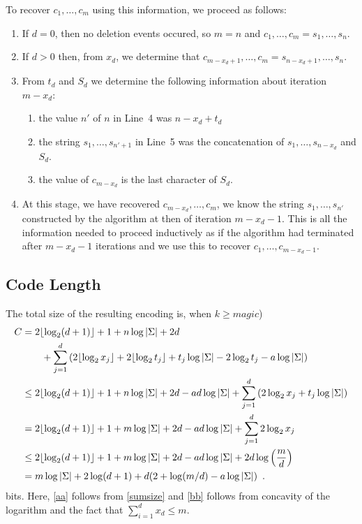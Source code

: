 \documentclass{patmorin}
\newcommand{\floor}[1]{\lfloor #1\rfloor}
\begin{document}
To recover $c_1,\ldots,c_m$ using this information, we proceed as follows:
\begin{enumerate}
  \item If $d=0$, then no deletion events occured, so $m=n$ and $c_1,\ldots,c_m = s_1,\ldots,s_n$.
  \item If $d>0$ then, from $x_d$, we determine that $c_{m-x_d+1},\ldots,c_m= s_{n-x_d+1},\ldots,s_n$.
  \item From $t_d$ and $S_d$ we determine the following information about iteration $m-x_d$:
  \begin{enumerate} 
    \item the value $n'$ of $n$ in Line~4 was $n-x_d+t_d$ 
    \item the string $s_1,\ldots,s_{n'+1}$ in Line~5 was the concatenation of $s_1,\ldots,s_{n-x_d}$ and $S_d$.
    \item the value of $c_{m-x_d}$ is the last character of $S_d$.
  \end{enumerate}
  \item At this stage, we have recovered $c_{m-x_d},\ldots,c_m$, we know the string $s_1,\ldots,s_{n'}$ constructed by the algorithm at then of iteration $m-x_d-1$.  This is all the information needed to proceed inductively as if the algorithm had terminated after $m-x_d-1$ iterations and we use this to recover $c_1,\ldots,c_{m-x_d-1}$.
\end{enumerate}

\subsection{Code Length}

The total size of the resulting encoding is, when $k \ge magic$)
\begin{align}
  C & = 2\floor{\log_2(d+1)}+1 
    + n\log|\Sigma| 
    + 2d \notag 
    \\ &\qquad {}+\sum_{j=1}^d\left(2\floor{\log_2x_j}+2\floor{\log_2 t_j}+t_j\log|\Sigma| - 2\log_2 t_j - a\log|\Sigma|\right) \notag \\ 
  & \le 2\floor{\log_2(d+1)}+1 
      + n\log|\Sigma| 
      + 2d  
      - ad\log|\Sigma| 
      + \sum_{j=1}^d\left(2\log_2x_j+t_j\log|\Sigma|\right) \notag \\ 
  & = 2\floor{\log_2(d+1)}+1 
    + m\log|\Sigma| 
    + 2d 
    - ad\log|\Sigma| 
    + \sum_{j=1}^d2\log_2x_j  \eqlabel{aa} \\ 
  & \le 2\floor{\log_2(d+1)}+1 
    + m\log|\Sigma| 
    + 2d
    - ad\log|\Sigma| 
    + 2d\log\left(\frac{m}{d}\right) \\
  & = m\log|\Sigma| + 2\log(d+1) + d(2+\log(m/d)-a\log|\Sigma|) \enspace . 
\end{align}
bits.  Here, \eqref{aa} follows from \eqref{sumsize} and \eqref{bb} follows from concavity of the logarithm and the fact that $\sum_{i=1}^d x_d\le m$.
\end{document}

